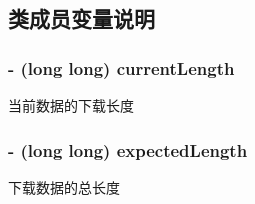 \subsection{类成员变量说明}
\hypertarget{interface_info_view_controller_a5cda7e7567608b413aa8f2a82b05cf50}{
\subsubsection[{current\-Length}]{\setlength{\rightskip}{0pt plus 5cm}-\/ (long long) current\-Length\hspace{0.3cm}{\ttfamily [protected]}}}\label{interface_info_view_controller_a5cda7e7567608b413aa8f2a82b05cf50}
当前数据的下载长度 \hypertarget{interface_info_view_controller_a46035a05e80e8252c07e1f2f88e034da}{
\subsubsection[{expected\-Length}]{\setlength{\rightskip}{0pt plus 5cm}-\/ (long long) expected\-Length\hspace{0.3cm}{\ttfamily [protected]}}}\label{interface_info_view_controller_a46035a05e80e8252c07e1f2f88e034da}
下载数据的总长度 

